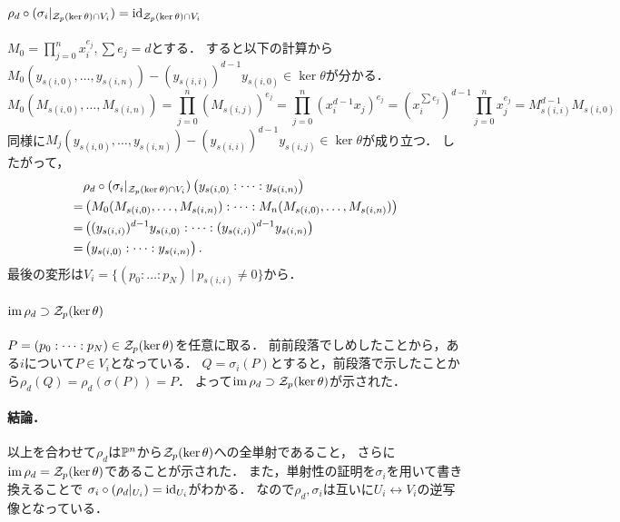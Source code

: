 \documentclass[a4paper]{jsarticle}
\begin{document}
    \paragraph{$\rho_d \circ (\sigma_i|_{\zerosp(\ker \theta) \cap V_i})=\id[\zerosp(\ker \theta) \cap V_i]$}
    $M_0=\prod_{j=0}^{n}{x_i^{e_j}}, \sum{e_j}=d$とする．
    すると以下の計算から$M_0(y_{s(i,0)},\dots,y_{s(i,n)})-(y_{s(i,i)})^{d-1} y_{s(i,0)} \in \ker \theta$が分かる．
    \[
        M_0(M_{s(i,0)},\dots,M_{s(i,n)})
        =\prod_{j=0}^{n}{\left( M_{s(i,j)} \right)^{e_j}}
        =\prod_{j=0}^{n}{\left( x_i^{d-1} x_j \right)^{e_j}}
        =(x_i^{\sum{e_j}})^{d-1} \prod_{j=0}^{n}{x_j^{e_j}}
        =M_{s(i,i)}^{d-1} M_{s(i,0)}
    \]
    同様に$M_j(y_{s(i,0)},\dots,y_{s(i,n)})-(y_{s(i,i)})^{d-1} y_{s(i,j)} \in \ker \theta$が成り立つ．
    したがって，
    \begin{align*}
        {}&\rho_d \circ (\sigma_i|_{\zerosp(\ker \theta) \cap V_i})\left( y_{s(i,0)}:\dots:y_{s(i,n)} \right) \\
        =& \left( M_0(M_{s(i,0)},\dots,M_{s(i,n)}):\dots:M_n(M_{s(i,0)},\dots,M_{s(i,n)}) \right) \\
        =& \left( (y_{s(i,i)})^{d-1} y_{s(i,0)}:\dots:(y_{s(i,i)})^{d-1} y_{s(i,n)} \right) \\
        =& \left( y_{s(i,0)}:\dots:y_{s(i,n)} \right).
    \end{align*}
    最後の変形は$V_i=\{(p_0:\dots:p_N) ~|~ p_{s(i,i)} \neq 0\}$から．

    \paragraph{$\im \rho_d \supset \zerosp(\ker \theta)$}
    $P=(p_0:\dots:p_N) \in \zerosp(\ker \theta)$を任意に取る．
    前前段落でしめしたことから，ある$i$について$P \in V_i$となっている．
    $Q=\sigma_i(P)$とすると，前段落で示したことから$\rho_d(Q)=\rho_d(\sigma(P))=P$．
    よって$\im \rho_d \supset \zerosp(\ker \theta)$が示された．

    \paragraph{結論．}
    以上を合わせて$\rho_d$は$\proj^n$から$\zerosp(\ker \theta)$への全単射であること，
    さらに$\im \rho_d=\zerosp(\ker \theta)$であることが示された．
    また，単射性の証明を$\sigma_i$を用いて書き換えることで
    $\sigma_i \circ (\rho_d|_{U_i})=\id[U_i]$がわかる．
    なので$\rho_d, \sigma_i$は互いに$U_i \leftrightarrow V_i$の逆写像となっている．
\end{document}
